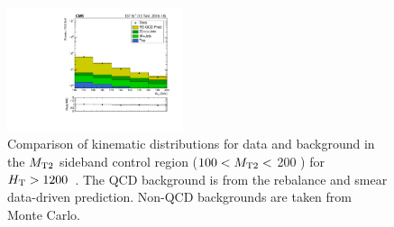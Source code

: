 \begin{figure}[!htbp]
\begin{center}
    \includegraphics[width=0.46\textwidth]{figs/qcd/rs_data/c_crRSMT2SideBandInclusiveHT1200toInf_h_mt2.pdf}
    \caption{Comparison of kinematic distributions for data and background in the $M_{\mathrm{T2}}$ sideband control region ($100< M_{\mathrm{T2}} <$ 200 \GeV) for $H_{\mathrm{T}} > 1200$~\GeV. The QCD background is from the
             rebalance and smear data-driven prediction. Non-QCD backgrounds are taken from Monte Carlo.
            }
    \label{Fig:rs_crRSMT2SideBandInclusiveHT1200toInf}
  \end{center}
\end{figure}

